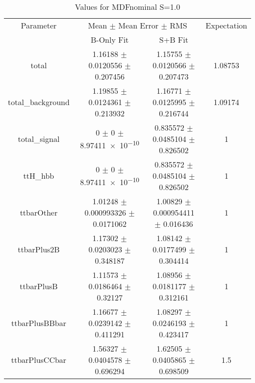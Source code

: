 \begin{table}
\centering
\caption{Values for MDFnominal S=1.0}
\begin{tabular}{cccc}
\toprule
Parameter & \multicolumn{2}{c}{Mean $\pm$ Mean Error $\pm$ RMS} & Expectation\\
 & B-Only Fit & S+B Fit & \\
\midrule
total & \num{1.16188} $\pm$ \num{0.0120556} $\pm$ \num{0.207456} & \num{1.15755} $\pm$ \num{0.0120566} $\pm$ \num{0.207473} & \num{1.08753}\\
total\_background & \num{1.19855} $\pm$ \num{0.0124361} $\pm$ \num{0.213932} & \num{1.16771} $\pm$ \num{0.0125995} $\pm$ \num{0.216744} & \num{1.09174}\\
total\_signal & \num{0} $\pm$ \num{0} $\pm$ \num{8.97411e-10} & \num{0.835572} $\pm$ \num{0.0485104} $\pm$ \num{0.826502} & \num{1}\\
ttH\_hbb & \num{0} $\pm$ \num{0} $\pm$ \num{8.97411e-10} & \num{0.835572} $\pm$ \num{0.0485104} $\pm$ \num{0.826502} & \num{1}\\
ttbarOther & \num{1.01248} $\pm$ \num{0.000993326} $\pm$ \num{0.0171062} & \num{1.00829} $\pm$ \num{0.000954411} $\pm$ \num{0.016436} & \num{1}\\
ttbarPlus2B & \num{1.17302} $\pm$ \num{0.0203023} $\pm$ \num{0.348187} & \num{1.08142} $\pm$ \num{0.0177499} $\pm$ \num{0.304414} & \num{1}\\
ttbarPlusB & \num{1.11573} $\pm$ \num{0.0186464} $\pm$ \num{0.32127} & \num{1.08956} $\pm$ \num{0.0181177} $\pm$ \num{0.312161} & \num{1}\\
ttbarPlusBBbar & \num{1.16677} $\pm$ \num{0.0239142} $\pm$ \num{0.411291} & \num{1.08297} $\pm$ \num{0.0246193} $\pm$ \num{0.423417} & \num{1}\\
ttbarPlusCCbar & \num{1.56327} $\pm$ \num{0.0404578} $\pm$ \num{0.696294} & \num{1.62505} $\pm$ \num{0.0405865} $\pm$ \num{0.698509} & \num{1.5}\\
\bottomrule
\end{tabular}
\end{table}